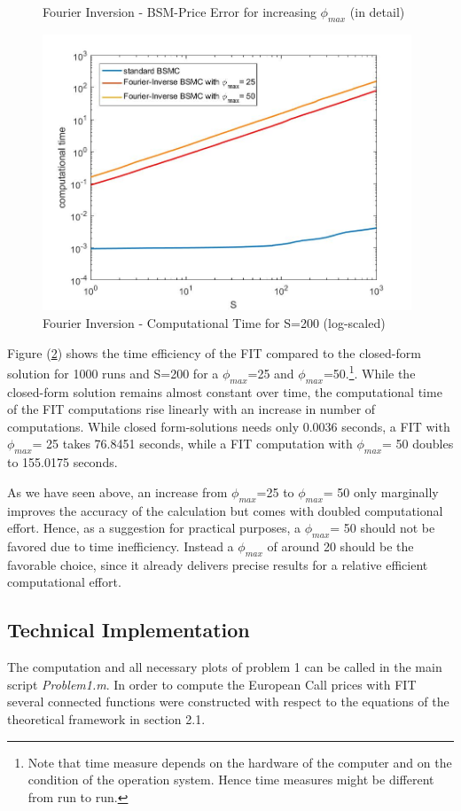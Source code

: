 \documentclass[a4paper,11pt]{article}
\begin{document}
\begin{figure}[!h]
\begin{subfigure}[c]{0.5\textwidth}
\end{subfigure}
\caption{Fourier Inversion - BSM-Price Error for increasing $\phi_{max}$ (in detail)}
\label{plot13}
\end{figure}

\begin{figure}[!h]
\includegraphics[width=11cm]{plot16.jpeg}
\centering
\caption{Fourier Inversion - Computational Time for S=200 (log-scaled)}
\label{plot16}
\end{figure}
\newpage

Figure (\ref{plot16}) shows the time efficiency of the FIT compared to the closed-form solution for 1000 runs and S=200 for a $\phi_{max}$=25 and $\phi_{max}$=50.\footnote{Note that time measure depends on the hardware of the computer and on the condition of the operation system. Hence time measures might be different from run to run.}. While the closed-form solution remains almost constant over time, the computational time of the FIT computations rise linearly with an increase in number of computations. While closed form-solutions needs only 0.0036 seconds, a FIT with $\phi_{max}$= 25 takes 76.8451 seconds, while a FIT computation with $\phi_{max}$= 50 doubles to 155.0175 seconds.

As we have seen above, an increase from $\phi_{max}$=25 to $\phi_{max}$= 50 only marginally improves the accuracy of the calculation but comes with doubled computational effort. Hence, as a suggestion for practical purposes, a $\phi_{max}$= 50 should not be favored due to time inefficiency. Instead a $\phi_{max}$ of around 20 should be the favorable choice, since it already delivers precise results for a relative efficient computational effort.

\subsection{Technical Implementation}
The computation and all necessary plots of problem 1 can be called in the main script \textit{Problem1.m}. In order to compute the European Call prices with FIT several connected functions were constructed with respect to the equations of the theoretical framework in section 2.1.
\end{document}

